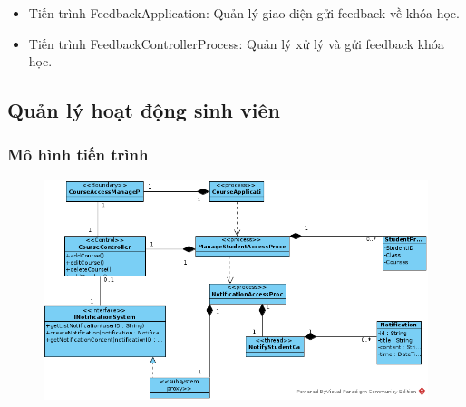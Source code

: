 \documentclass[./../main_file.tex]{subfiles}
\begin{document}
\begin{itemize}
	\item Tiến trình FeedbackApplication: Quản lý giao diện gửi feedback về khóa học.
	\item Tiến trình FeedbackControllerProcess: Quản lý xử lý và gửi feedback khóa học.
\end{itemize}

\subsection{Quản lý hoạt động sinh viên}

\subsubsection{Mô hình tiến trình}

\begin{figure}[H]
	\centering
	\includegraphics[width=\linewidth]{./images/pv_manage_studentactivity.png}
\end{figure}
\end{document}
